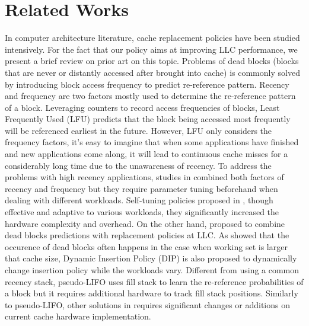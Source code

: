 \documentclass[conference]{IEEEtran}
\begin{document}
\section{Related Works}
In computer architecture literature, cache replacement policies have been studied intensively. For the fact that our policy aims at improving LLC performance, we present a brief review on prior art on this topic. Problems of dead blocks (blocks that are never or distantly accessed after brought into cache) is commonly solved by introducing block access frequency to predict re-reference pattern. Recency and frequency are two factors mostly used to determine the re-reference pattern of a block. Leveraging counters to record access frequencies of blocks,  Least Frequently Used (LFU) \cite{lee2001lrfu} predicts that the block being accessed most frequently will be referenced earliest in the future. However, LFU only considers the frequency factors, it's easy to imagine that when some applications have finished and new applications come along, it will lead to continuous cache misses for a considerably long time due to the unawareness of recency. To address the problems with high recency applications, studies in \cite{lee2001lrfu} \cite{o1993lru} \cite{robinson1990data} combined both factors of recency and frequency but they require parameter tuning beforehand when dealing with different workloads. Self-tuning policies proposed in \cite{megiddo2003arc} \cite{bansal2004car} \cite{subramanian2006adaptive}, though effective and adaptive to various workloads, they significantly increased the hardware complexity and overhead. On the other hand, \cite{liu2008cache} proposed to combine dead blocks predictions with replacement policies at LLC. As \cite{qureshi2007adaptive} showed that the occurence of dead blocks often happens in the case when working set is larger that cache size, Dynamic Insertion Policy (DIP) is also proposed to dynamically change insertion policy while the workloads vary. Different from using a common recency stack, pseudo-LIFO \cite{chaudhuri2009pseudo} uses fill stack to learn the re-reference probabilities of a block but it requires additional hardware to track fill stack positions. Similarly to pseudo-LIFO, other solutions in \cite{basu2007scavenger} \cite{johnson1994x3} \cite{loh2009extending} \cite{rajan2007emulating} \cite{zhou2001multi} requires significant changes or additions on current cache hardware implementation.
\end{document}
